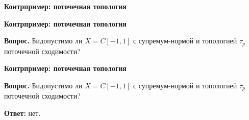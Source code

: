 \documentclass[11pt]{article}
\begin{document}
\newpage

\begin{center}
{\color{notaeYELLOW}\bfseries\fontsize{44}{52}\selectfont Контрпример: поточечная топология}
\end{center}
\vspace*{\fill}
\begin{center}
\fontsize{36}{43}\selectfont
\end{center}
\vspace*{\fill}

\newpage

\begin{center}
{\color{notaeYELLOW}\bfseries\fontsize{44}{52}\selectfont Контрпример: поточечная топология}
\end{center}
\vspace*{\fill}
\begin{center}
\fontsize{36}{43}\selectfont
\parbox{\linewidth}{\centering\noindent \textbf{Вопрос.} Бидопустимо ли $X=C[-1,1]$ с супремум-нормой и топологией $\tau_p$ поточечной сходимости?
\par}\vspace{0.4in}
\end{center}
\vspace*{\fill}

\newpage

\begin{center}
{\color{notaeYELLOW}\bfseries\fontsize{44}{52}\selectfont Контрпример: поточечная топология}
\end{center}
\vspace*{\fill}
\begin{center}
\fontsize{36}{43}\selectfont
\parbox{\linewidth}{\centering\noindent \textbf{Вопрос.} Бидопустимо ли $X=C[-1,1]$ с супремум-нормой и топологией $\tau_p$ поточечной сходимости?
\par}\vspace{0.4in}
\parbox{\linewidth}{\centering\noindent \textbf{Ответ:} нет.
\par}\vspace{0.4in}
\end{center}
\vspace*{\fill}

\newpage
\end{document}
